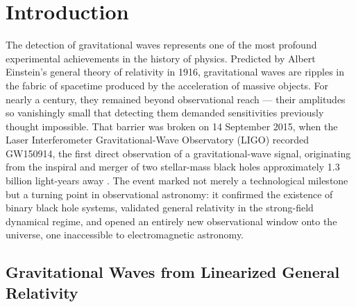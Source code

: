 \section{Introduction} \label{sec:1}

The detection of gravitational waves represents one of the most profound experimental achievements
in the history of physics. Predicted by Albert Einstein's general theory of relativity in 1916,
gravitational waves are ripples in the fabric of spacetime produced by the acceleration of massive
objects. For nearly a century, they remained beyond observational reach --- their amplitudes so
vanishingly small that detecting them demanded sensitivities previously thought impossible. That
barrier was broken on 14 September 2015, when the Laser Interferometer Gravitational-Wave
Observatory (LIGO) recorded GW150914, the first direct observation of a gravitational-wave signal,
originating from the inspiral and merger of two stellar-mass black holes approximately 1.3 billion
light-years away \cite{Abbott2016Discovery}. The event marked not merely a technological milestone but a
turning point in observational astronomy: it confirmed the existence of binary black hole systems,
validated general relativity in the strong-field dynamical regime, and opened an entirely new
observational window onto the universe, one inaccessible to electromagnetic astronomy.

\subsection*{Gravitational Waves from Linearized General Relativity}

